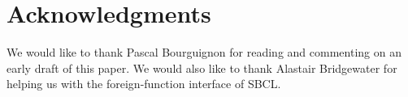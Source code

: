 \section{Acknowledgments}

We would like to thank Pascal Bourguignon for reading and commenting
on an early draft of this paper.  We would also like to thank Alastair
Bridgewater for helping us with the foreign-function interface of
SBCL.
